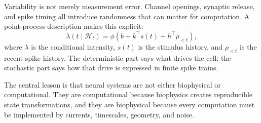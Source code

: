 Variability is not merely measurement error. Channel openings, synaptic release, and spike timing all introduce randomness that can matter for computation. A point-process description makes this explicit:
\[
  \lambda(t \mid \mathcal{H}_t)
  =
  \phi\!\left(b + k^\top s(t) + h^\top \rho_{<t}\right),
\]
where \(\lambda\) is the conditional intensity, \(s(t)\) is the stimulus history, and \(\rho_{<t}\) is the recent spike history. The deterministic part says what drives the cell; the stochastic part says how that drive is expressed in finite spike trains.

The central lesson is that neural systems are not either biophysical or computational. They are computational because biophysics creates reproducible state transformations, and they are biophysical because every computation must be implemented by currents, timescales, geometry, and noise.
